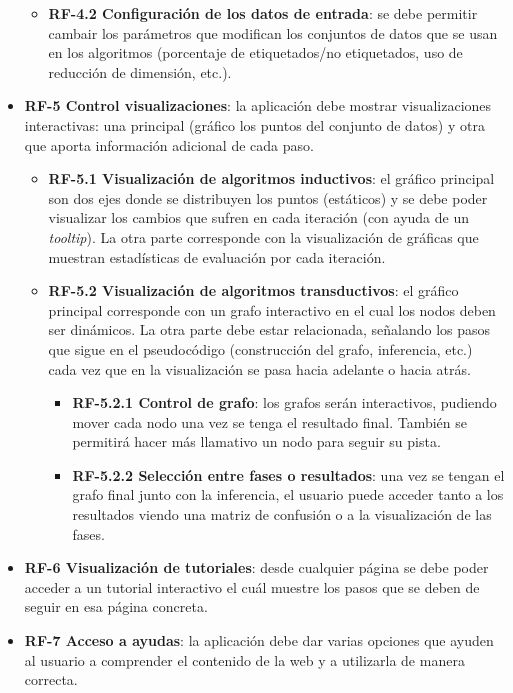 \begin{itemize}
\begin{itemize}
		\item \textbf{RF-4.2 Configuración de los datos de entrada}: se debe permitir cambair los parámetros que modifican los conjuntos de datos que se usan en los algoritmos (porcentaje de etiquetados/no etiquetados, uso de reducción de dimensión, etc.).
	\end{itemize} 
	\item \textbf{RF-5 Control visualizaciones}: la aplicación debe mostrar visualizaciones interactivas: una principal (gráfico los puntos del conjunto de datos) y otra que aporta información adicional de cada paso.
	\begin{itemize}
		\item \textbf{RF-5.1 Visualización de algoritmos inductivos}: el gráfico principal son dos ejes donde se distribuyen los puntos (estáticos) y se debe poder visualizar los cambios que sufren en cada iteración (con ayuda de un \textit{tooltip}). La otra parte corresponde con la visualización de gráficas que muestran estadísticas de evaluación por cada iteración.
		\item \textbf{RF-5.2 Visualización de algoritmos transductivos}: el gráfico principal corresponde con un grafo interactivo en el cual los nodos deben ser dinámicos. La otra parte debe estar relacionada, señalando los pasos que sigue en el pseudocódigo (construcción del grafo, inferencia, etc.) cada vez que en la visualización se pasa hacia adelante o hacia atrás.
		\begin{itemize}
			\item \textbf{RF-5.2.1 Control de grafo}: los grafos serán interactivos, pudiendo mover cada nodo una vez se tenga el resultado final. También se permitirá hacer más llamativo un nodo para seguir su pista.
			\item \textbf{RF-5.2.2 Selección entre fases o resultados}: una vez se tengan el grafo final junto con la inferencia, el usuario puede acceder tanto a los resultados viendo una matriz de confusión o a la visualización de las fases.
		\end{itemize}
	\end{itemize}
	\item \textbf{RF-6 Visualización de tutoriales}: desde cualquier página se debe poder acceder a un tutorial interactivo el cuál muestre los pasos que se deben de seguir en esa página concreta.
	\item \textbf{RF-7 Acceso a ayudas}: la aplicación debe dar varias opciones que ayuden al usuario a comprender el contenido de la web y a utilizarla de manera correcta.

\end{itemize}
